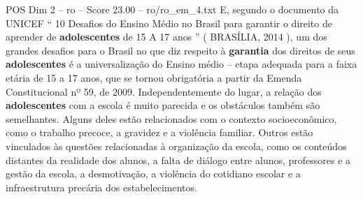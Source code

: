 \begin{textsample}{POS Dim 2 – ro – Score 23.00 – ro/ro\_em\_4.txt}
E, segundo o documento da UNICEF “ 10 Desafios do Ensino Médio no Brasil para garantir o direito de aprender de \textbf{adolescentes} de 15 A 17 anos ” ( BRASÍLIA, 2014 ), um dos grandes desafios para o Brasil no que diz respeito à \textbf{garantia} dos direitos de seus \textbf{adolescentes} é a universalização do Ensino médio – etapa adequada para a faixa etária de 15 a 17 anos, que se tornou obrigatória a partir da Emenda Constitucional nº 59, de 2009.
Independentemente do lugar, a relação dos \textbf{adolescentes} com a escola é muito parecida e os obstáculos também são semelhantes.
Alguns deles estão relacionados com o contexto socioeconômico, como o trabalho precoce, a gravidez e a violência familiar.
Outros estão vinculados às questões relacionadas à organização da escola, como os conteúdos distantes da realidade dos alunos, a falta de diálogo entre alunos, professores e a gestão da escola, a desmotivação, a violência do cotidiano escolar e a infraestrutura precária dos estabelecimentos.

\end{textsample}
